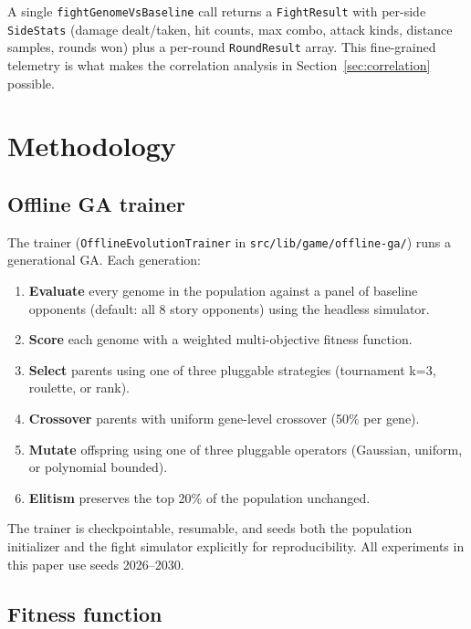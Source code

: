 \documentclass[conference]{IEEEtran}
\begin{document}
A single \texttt{fightGenomeVsBaseline} call returns a \texttt{FightResult} with per-side \texttt{SideStats} (damage dealt/taken, hit counts, max combo, attack kinds, distance samples, rounds won) plus a per-round \texttt{RoundResult} array. This fine-grained telemetry is what makes the correlation analysis in Section~\ref{sec:correlation} possible.

\section{Methodology}
\label{sec:method}

\subsection{Offline GA trainer}

The trainer (\texttt{OfflineEvolutionTrainer} in \texttt{src/lib/game/offline-ga/}) runs a generational GA. Each generation:
\begin{enumerate}
\item \textbf{Evaluate} every genome in the population against a panel of baseline opponents (default: all 8 story opponents) using the headless simulator.
\item \textbf{Score} each genome with a weighted multi-objective fitness function.
\item \textbf{Select} parents using one of three pluggable strategies (tournament k=3, roulette, or rank).
\item \textbf{Crossover} parents with uniform gene-level crossover (50\% per gene).
\item \textbf{Mutate} offspring using one of three pluggable operators (Gaussian, uniform, or polynomial bounded).
\item \textbf{Elitism} preserves the top 20\% of the population unchanged.
\end{enumerate}

The trainer is checkpointable, resumable, and seeds both the population initializer and the fight simulator explicitly for reproducibility. All experiments in this paper use seeds 2026--2030.

\subsection{Fitness function}
\end{document}
